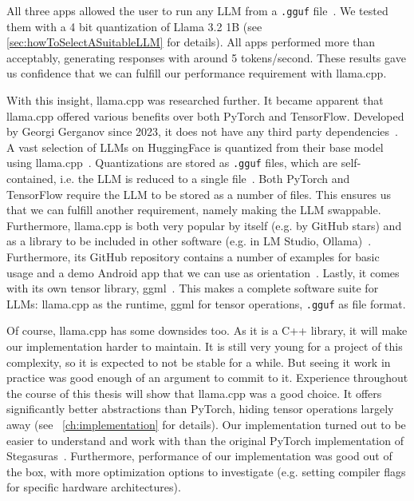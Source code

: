 All three apps allowed the user to run any \gls{LLM} from a \lstinline|.gguf| file~\cite{panchalShubham0204SmolChatAndroid2025,vali-98Vali98ChatterUI2025,ghorbaniAghorbaniPocketpalai2025}. We tested them with a 4 bit quantization of Llama 3.2 1B (see \cref{sec:howToSelectASuitableLLM} for details). All apps performed more than acceptably, generating responses with around 5 tokens/second. These results gave us confidence that we can fulfill our performance requirement with llama.cpp.

With this insight, llama.cpp was researched further. It became apparent that llama.cpp offered various benefits over both PyTorch and TensorFlow. Developed by Georgi Gerganov since 2023, it does not have any third party dependencies~\cite{gerganovGgerganovLlamacpp2024}. A vast selection of \glspl{LLM} on HuggingFace is quantized from their base model using llama.cpp~\cite{huggingfaceModelsHuggingFace2025}. Quantizations are stored as \lstinline|.gguf| files, which are self-contained, i.e. the \gls{LLM} is reduced to a single file~\cite{huggingfaceGGUF}. Both PyTorch and TensorFlow require the \gls{LLM} to be stored as a number of files. This ensures us that we can fulfill another requirement, namely making the \gls{LLM} swappable. Furthermore, llama.cpp is both very popular by itself (e.g. by GitHub stars) and as a library to be included in other software (e.g. in LM Studio, Ollama)~\cite{gerganovGgerganovLlamacpp2024}. Furthermore, its GitHub repository contains a number of examples for basic usage and a demo Android app that we can use as orientation~\cite{gerganovGgerganovLlamacpp2024}. Lastly, it comes with its own tensor library, ggml~\cite{gerganovGgerganovGgml2024}. This makes a complete software suite for \glspl{LLM}: llama.cpp as the runtime, ggml for tensor operations, \lstinline|.gguf| as file format.

Of course, llama.cpp has some downsides too. As it is a C++ library, it will make our implementation harder to maintain. It is still very young for a project of this complexity, so it is expected to not be stable for a while. But seeing it work in practice was good enough of an argument to commit to it. Experience throughout the course of this thesis will show that llama.cpp was a good choice. It offers significantly better abstractions than PyTorch, hiding tensor operations largely away (see ~\cref{ch:implementation} for details). Our implementation turned out to be easier to understand and work with than the original PyTorch implementation of Stegasuras~\cite{zieglerHarvardnlpNeuralSteganography2025}. Furthermore, performance of our implementation was good out of the box, with more optimization options to investigate (e.g. setting compiler flags for specific hardware architectures).


